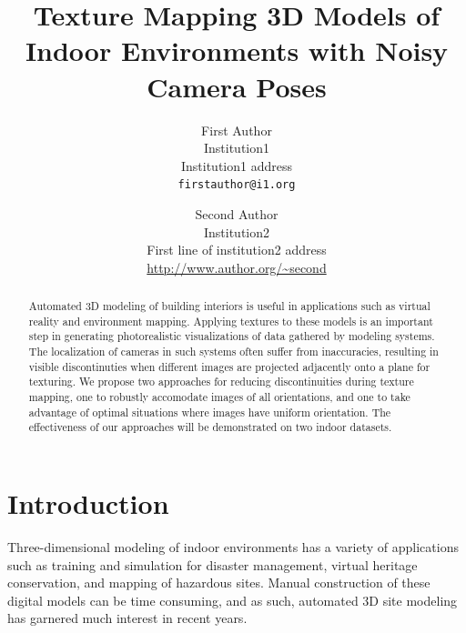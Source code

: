 \documentclass[10pt,twocolumn,letterpaper]{article}
\begin{document}
\title{Texture Mapping 3D Models of Indoor Environments with Noisy
  Camera Poses}

\author{First Author\\
  Institution1\\
  Institution1 address\\
  {\tt\small firstauthor@i1.org}
  \and
  Second Author\\
  Institution2\\
  First line of institution2 address\\
  {\small\url{http://www.author.org/~second}} }

\maketitle

\begin{abstract}
  Automated 3D modeling of building interiors is useful in
  applications such as virtual reality and environment
  mapping. Applying textures to these models is an important step in
  generating photorealistic visualizations of data gathered by
  modeling systems.  The localization of cameras in such systems often
  suffer from inaccuracies, resulting in visible discontinuties when
  different images are projected adjacently onto a plane for
  texturing. We propose two approaches for reducing discontinuities
  during texture mapping, one to robustly accomodate images of all
  orientations, and one to take advantage of optimal situations where
  images have uniform orientation. The effectiveness of our approaches
  will be demonstrated on two indoor datasets.
\end{abstract}

\section{Introduction}
\label{sec:introduction}
Three-dimensional modeling of indoor environments has a variety of
applications such as training and simulation for disaster management,
virtual heritage conservation, and mapping of hazardous sites. Manual
construction of these digital models can be time consuming, and as
such, automated 3D site modeling has garnered much interest in recent
years.
\end{document}
